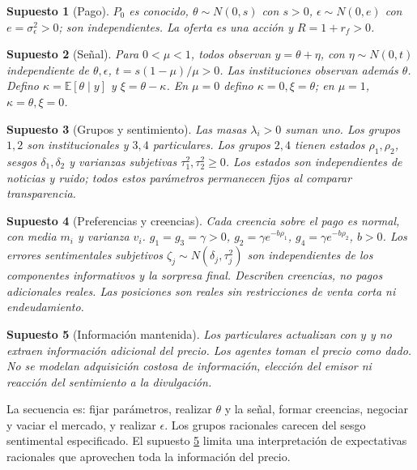 \documentclass[11pt]{article}
\newcommand{\E}{\mathbb E}
\newtheorem{assumption}{Supuesto}
\begin{document}
\begin{assumption}[Pago]\label{as:payoff}
$P_0$ es conocido, $\theta\sim N(0,s)$ con $s>0$,
$\epsilon\sim N(0,e)$ con $e=\sigma_\epsilon^2>0$; son independientes.
La oferta es una acción y $R=1+r_f>0$.
\end{assumption}
\begin{assumption}[Señal]\label{as:signal}
Para $0<\mu<1$, todos observan $y=\theta+\eta$, con
$\eta\sim N(0,t)$ independiente de $\theta,\epsilon$,
$t=s(1-\mu)/\mu>0$. Las instituciones observan además $\theta$.
Defino $\kappa=\E[\theta\mid y]$ y $\xi=\theta-\kappa$.
En $\mu=0$ defino $\kappa=0,\xi=\theta$; en $\mu=1$,
$\kappa=\theta,\xi=0$.
\end{assumption}
\begin{assumption}[Grupos y sentimiento]\label{as:sent}
Las masas $\lambda_i>0$ suman uno. Los grupos $1,2$ son institucionales y
$3,4$ particulares. Los grupos $2,4$ tienen estados $\rho_1,\rho_2$,
sesgos $\delta_1,\delta_2$ y varianzas subjetivas $\tau_1^2,\tau_2^2\geq0$.
Los estados son independientes de noticias y ruido; todos estos parámetros
permanecen fijos al comparar transparencia.
\end{assumption}
\begin{assumption}[Preferencias y creencias]\label{as:beliefs}
Cada creencia sobre el pago es normal, con media $m_i$ y varianza $v_i$.
$g_1=g_3=\gamma>0$, $g_2=\gamma e^{-b\rho_1}$,
$g_4=\gamma e^{-b\rho_2}$, $b>0$.
Los errores sentimentales subjetivos $\zeta_j\sim N(\delta_j,\tau_j^2)$
son independientes de los componentes informativos y la sorpresa final.
Describen creencias, no pagos adicionales reales. Las posiciones son reales
sin restricciones de venta corta ni endeudamiento.
\end{assumption}
\begin{assumption}[Información mantenida]\label{as:price}
Los particulares actualizan con $y$ y no extraen información adicional del
precio. Los agentes toman el precio como dado. No se modelan adquisición
costosa de información, elección del emisor ni reacción del sentimiento a
la divulgación.
\end{assumption}

La secuencia es: fijar parámetros, realizar $\theta$ y la señal, formar
creencias, negociar y vaciar el mercado, y realizar $\epsilon$. Los grupos
racionales carecen del sesgo sentimental especificado. El supuesto
\ref{as:price} limita una interpretación de expectativas racionales que
aprovechen toda la información del precio.
\end{document}

